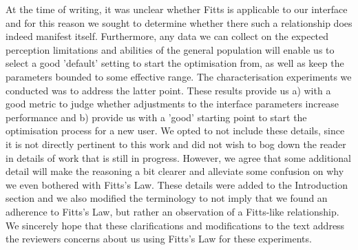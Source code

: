 \documentclass{article}
\begin{document}
\begin{itemize}
  At the time of writing, it was unclear whether Fitts is applicable to our interface and for this reason we sought to determine whether there such a relationship does indeed manifest itself.
  Furthermore, any data we can collect on the expected perception limitations and abilities of the general population will enable us to select a good 'default' setting to start the optimisation from, as well as keep the parameters bounded to some effective range.
  The characterisation experiments we conducted was to address the latter point.
  These results provide us a) with a good metric to judge whether adjustments to the interface parameters increase performance and b) provide us with a 'good' starting point to start the optimisation process for a new user.
  We opted to not include these details, since it is not directly pertinent to this work and did not wish to bog down the reader in details of work that is still in progress.
  However, we agree that some additional detail will make the reasoning a bit clearer and alleviate some confusion on why we even bothered with Fitts's Law.
  These details were added to the Introduction section and we also modified the terminology to not imply that we found an adherence to Fitts's Law, but rather an observation of a Fitts-like relationship.
  We sincerely hope that these clarifications and modifications to the text address the reviewers concerns about us using Fitts's Law for these experiments. 


\end{itemize}
\end{document}
